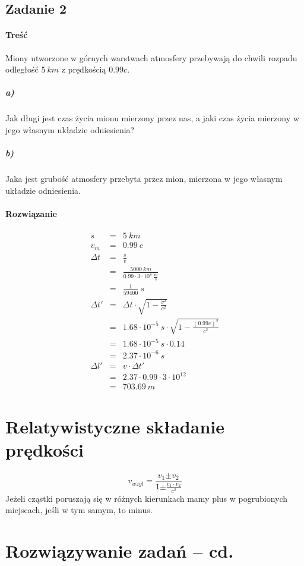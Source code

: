 \documentclass [a4paper, 11pt, oneside]{book}
\begin{document}
		\subsection{Zadanie 2} %
		\label{sub:zadanie_2}
			\paragraph{Treść}
			Miony utworzone w górnych warstwach atmosfery przebywają do chwili rozpadu odległość $5~km$ z prędkością $0.99c$.
				\subparagraph{a)}Jak długi jest czas życia mionu mierzony przez nas, a jaki czas życia mierzony w jego własnym układzie odniesienia?
				\subparagraph{b)}Jaka jest grubość atmosfery przebyta przez mion, mierzona w jego własnym układzie odniesienia.
			\paragraph{Rozwiązanie}
			\begin{eqnarray*}
				s &=& 5~km\\
				v_m & = & 0.99~c\\
				\Delta t &=& \frac{s}{v}\\
				&=& \frac{5000~km}{0.99\cdot3\cdot10^8~\frac{m}{s}}\\
				&=& \frac{1}{59400}~s\\
				\Delta t' & = & \Delta t\cdot\sqrt{1-\frac{v^2}{c^2}}\\
				&=& 1.68\cdot10^{-5}~s\cdot\sqrt{1-\frac{(0.99c)^2}{c^2}}\\
				& = & 1.68\cdot10^{-5}~s\cdot0.14\\
				&=& 2.37\cdot10^{-6}~s\\
				\Delta l' &=& v\cdot\Delta t'\\
				&=& 2.37\cdot0.99\cdot3\cdot10^{12}\\
				&=& 703.69~m
			\end{eqnarray*}
\section{Relatywistyczne składanie prędkości} %
\label{sec:relatywistyczne_sk_adanie_pr_dko_ci}
	\[
		v_{wzgl} = \frac{v_1\mathbf{\pm}v_2}{1\mathbf{\pm}\frac{v_1\cdot v_2}{c^2}}
	\]
	Jeżeli cząstki poruszają się w różnych kierunkach mamy plus w pogrubionych miejscach, jeśli w tym samym, to minus.
\section{Rozwiązywanie zadań -- cd.} %
\label{sec:rozwi_zywanie_zada_cd_}
\end{document}
